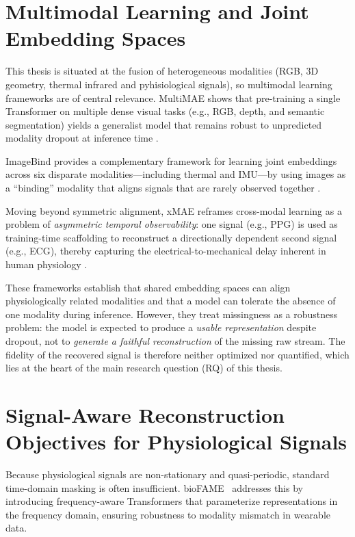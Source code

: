 \section{Multimodal Learning and Joint Embedding Spaces}
\label{sec:rw-multimodal}
This thesis is situated at the fusion of heterogeneous modalities (RGB, 3D
geometry, thermal infrared and pyhisiological signals), so multimodal learning frameworks are of
central relevance. MultiMAE shows that pre-training a single Transformer on
multiple dense visual tasks (e.g., RGB, depth, and semantic segmentation) yields
a generalist model that remains robust to unpredicted modality dropout at
inference time \cite{bachmann2022multimae}. 

ImageBind provides a complementary framework for learning joint embeddings across six disparate
modalities---including thermal and IMU---by using images as a \enquote{binding}
modality that aligns signals that are rarely observed together
\cite{girdhar2023imagebind}. 

Moving beyond symmetric alignment, xMAE reframes cross-modal learning as a problem of \emph{asymmetric temporal observability}:
one signal (e.g., PPG) is used as training-time scaffolding to reconstruct a
directionally dependent second signal (e.g., ECG), thereby capturing the
electrical-to-mechanical delay inherent in human physiology \cite{zhou2026xmae}.

These frameworks establish that shared embedding spaces can align physiologically related modalities and 
that a model can tolerate the absence of one modality during inference. 
However, they treat missingness as a robustness problem: the model is expected to produce a \emph{usable representation} despite
dropout, not to \emph{generate a faithful reconstruction} of the missing raw
stream. The fidelity of the recovered signal is therefore neither optimized nor
quantified, which lies at the heart of the main research question (RQ) of this
thesis.

\section{Signal-Aware Reconstruction Objectives for Physiological Signals}
\label{sec:rw-spectral}
Because physiological signals are non-stationary and quasi-periodic, standard
time-domain masking is often insufficient. bioFAME~\cite{liu2024biofame} addresses this by introducing
frequency-aware Transformers that parameterize representations in the frequency
domain, ensuring robustness to modality mismatch in wearable data. 

